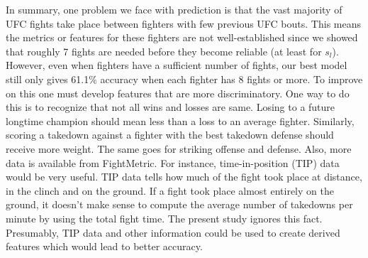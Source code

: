 In summary, one problem we face with prediction is that the vast
majority of UFC fights take place between fighters with few
previous UFC bouts. This means the metrics or features for these
fighters are not well-established since we showed that roughly 7 fights are needed
before they become reliable (at least for $s_l$). However, even when fighters have
a sufficient number of fights, our best model still only gives
61.1\% accuracy when each fighter has 8 fights or more. To improve on this one must develop features
that are more discriminatory. One way to do this is to recognize that
not all wins and losses are same. Losing to a future longtime champion
should mean less than a loss to an average fighter. Similarly, scoring
a takedown against a fighter with the best takedown defense should receive
more weight. The same goes for striking offense and defense. Also, more data is available from FightMetric. For instance,
time-in-position (TIP) data would be very useful. 
TIP data tells how much of the fight took place at distance,
in the clinch and on the ground.
If a fight
took place almost entirely on the ground, it doesn't make sense to compute the average
number of takedowns per minute by using the total fight time. The present
study ignores this fact.
Presumably, TIP data and other information could be
used to create derived features which would lead to better
accuracy.
